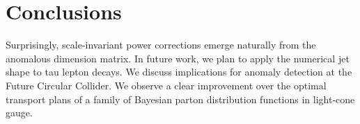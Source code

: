 \section{Conclusions}\label{sec:conclusions}

Surprisingly, scale-invariant power corrections emerge naturally from
the anomalous dimension matrix. In future work, we plan to apply the
numerical jet shape to tau lepton decays. We discuss implications for
anomaly detection at the Future Circular Collider. We observe a clear
improvement over the optimal transport plans of a family of Bayesian
parton distribution functions in light-cone gauge.

